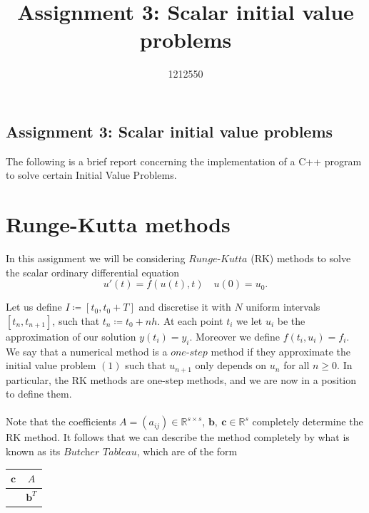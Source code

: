 \documentclass[10pt]{article}
\begin{document}
\title{Assignment 3: Scalar initial value problems}
\author{1212550}
\begin{center}
\section*{Assignment 3: Scalar initial value problems}


The following is a brief report concerning the implementation of a C++ program to solve certain Initial Value Problems.\\
\end{center}

\section{Runge-Kutta methods}

In this assignment we will be considering $\textit{Runge-Kutta}$ (RK) methods to solve the scalar ordinary differential equation
\begin{equation}
    u'(t) = f(u(t),t) \quad u(0) = u_0.
\end{equation}

Let us define $I \coloneqq [t_0,t_0+T]$ and discretise it with $N$ uniform intervals $[t_n,t_{n+1}]$, such that $t_n \coloneqq t_0 + nh$. At each point $t_i$ we let $u_i$ be the approximation of our solution $y(t_i) = y_i$. Moreover we define $f(t_i,u_i) = f_i$. We say that a numerical method is a $\textit{one-step}$ method if they approximate the initial value problem $(1)$ such that $u_{n+1}$ only depends on $u_n$ for all $n \geq 0$. In particular, the RK methods are one-step methods, and we are now in a position to define them.\\

\noindent{}
\\

Note that the coefficients $A = (a_{ij}) \in \mathbb{R}^{s \times s}$,
$\textbf{b},~ \textbf{c} \in \mathbb{R}^s$ completely determine the RK method. It follows that we can describe the method completely by what is known as its $\textit{Butcher Tableau}$, which are of the form
\begin{center}
\begin{tabular}{ c|c }
 $\textbf{c}$& $A$ \\
  \hline
   & $\textbf{b}^T$  \\
\end{tabular}
\end{center}
\end{document}
